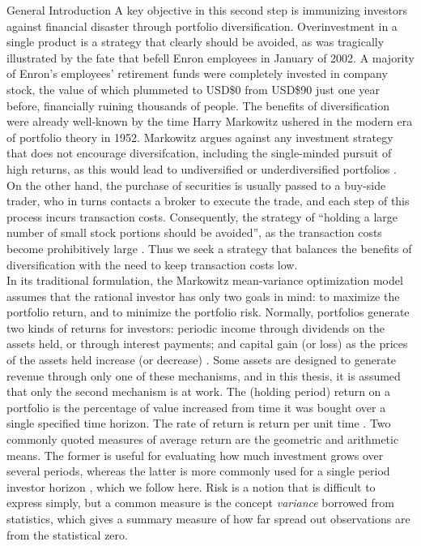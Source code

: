 \begin{section}{General Introduction}
A key objective in this second step is immunizing investors against financial disaster through portfolio diversification. Overinvestment in a single product is a strategy that clearly should be avoided, as was tragically illustrated by the fate that befell Enron employees in January of 2002. A majority of Enron's employees' retirement funds were completely invested in company stock, the value of which plummeted to USD\$0 from USD\$90 just one year before, financially ruining thousands of people. The benefits of diversification were already well-known by the time Harry Markowitz ushered in the modern era of portfolio theory in 1952. Markowitz argues against any investment strategy that does not encourage diversifcation, including the single-minded pursuit of high returns, as this would lead to undiversified or underdiversified portfolios \cite{Markowitz1952}. On the other hand, the purchase of securities is usually passed to a buy-side trader, who in turns contacts a broker to execute the trade, and each step of this process incurs transaction costs. Consequently, the strategy of ``holding a large number of small stock portions should be avoided'', as the transaction costs become prohibitively large \cite{Takeda2013}. Thus we seek a strategy that balances the benefits of diversification with the need to keep transaction costs low. \\

In its traditional formulation, the Markowitz mean-variance optimization model assumes that the rational investor has only two goals in mind: to maximize the portfolio return, and to minimize the portfolio risk. Normally, portfolios generate two kinds of returns for investors: periodic income through dividends on the assets held, or through interest payments; and capital gain (or loss) as the prices of the assets held increase (or decrease) \cite{Singal2013}. Some assets are designed to generate revenue through only one of these mechanisms, and in this thesis, it is assumed that only the second mechanism is at work.  The (holding period) return on a portfolio is the percentage of value increased from time it was bought over a single specified time horizon. The rate of return is return per unit time \cite{Chen}. Two commonly quoted measures of average return are the geometric and arithmetic means. The former is useful for evaluating how much investment grows over several periods, whereas the latter is more commonly used for a single period investor horizon \cite{Goetzmann}, which we follow here. Risk is a notion that is difficult to express simply, but a common measure is the concept \textit{variance} borrowed from statistics, which gives a summary measure of how far spread out observations are from the statistical zero.\\


\end{section}

